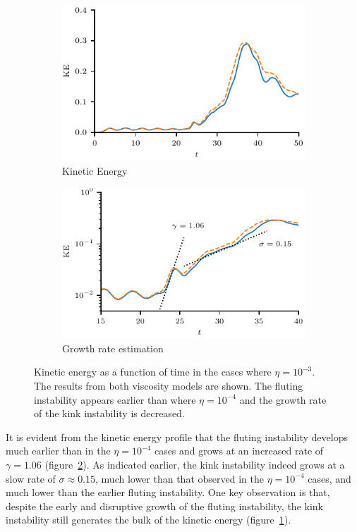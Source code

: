\begin{figure}[t]
  \centering
    \begin{subfigure}{0.49\textwidth}
      \includegraphics[width=\linewidth]{kinetic_energy-3.pdf}
      \caption{Kinetic Energy}
      \label{fig:kink_ke-3}
    \end{subfigure}
    \hfill
    \begin{subfigure}{0.49\textwidth}
      \includegraphics[width=\linewidth]{kinetic_energy_log-3.pdf}
      \caption{Growth rate estimation}
      \label{fig:kink_ke_log-3}
    \end{subfigure}
\caption{Kinetic energy as a function of time in the cases where $\eta=10^{-3}$. The results from both viscosity models are shown. The fluting instability appears earlier than where $\eta=10^{-4}$ and the growth rate of the kink instability is decreased.}
\label{fig:kink_str8_ke-3}%
\end{figure}

It is evident from the kinetic energy profile that the fluting instability develops much earlier than in the $\eta=10^{-4}$ cases and grows at an increased rate of $\gamma = 1.06$ (figure~\ref{fig:kink_ke_log-3}). As indicated earlier, the kink instability indeed grows at a slow rate of $\sigma \approx 0.15$, much lower than that observed in the $\eta=10^{-4}$ cases, and much lower than the earlier fluting instability. One key observation is that, despite the early and disruptive growth of the fluting instability, the kink instability still generates the bulk of the kinetic energy (figure~\ref{fig:kink_ke-3}).

